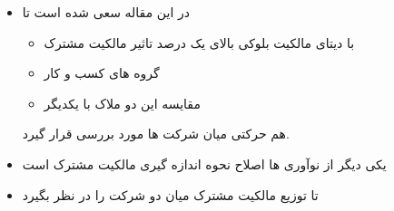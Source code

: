 \documentclass[12pt, a4paper]{article}
\begin{document}


\begin{itemize}
\item
در این مقاله سعی شده است تا
\begin{itemize}
\item
با دیتای مالکیت بلوکی بالای یک درصد تاثیر مالکیت مشترک 
\item 
گروه های کسب و کار 
\item 
مقایسه این دو ملاک با یکدیگر

\end{itemize}
هم حرکتی میان شرکت ها مورد بررسی قرار گیرد.
\end{itemize}
 
 
 \begin{itemize}
 \item
 یکی دیگر از نوآوری ها اصلاح نحوه اندازه گیری مالکیت مشترک است
 \item
 تا توزیع مالکیت مشترک میان دو شرکت را در نظر بگیرد
 \end{itemize}
 
%
%
\end{document}
